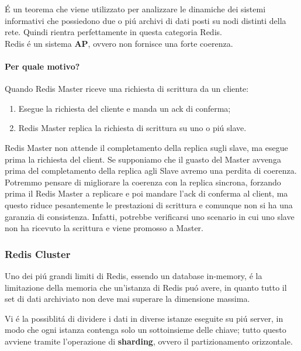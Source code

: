 É un teorema che viene utilizzato per analizzare le dinamiche dei sistemi informativi che possiedono due o piú archivi di dati posti su
nodi distinti della rete. Quindi rientra perfettamente in questa categoria Redis.\\

Redis é un sistema \textbf{AP}, ovvero non fornisce una forte coerenza.
\paragraph{Per quale motivo?\\}
Quando Redis Master riceve una richiesta di scrittura da un cliente:
\begin{enumerate}
    \item Esegue la richiesta del cliente e manda un ack di conferma;
    \item Redis Master replica la richiesta di scrittura su uno o piú slave.
\end{enumerate}

Redis Master non attende il completamento della replica sugli slave, ma esegue prima la richiesta del client.
Se supponiamo che il guasto del Master avvenga prima del completamento della replica agli Slave avremo una perdita di coerenza.\\

Potremmo pensare di migliorare la coerenza con la replica sincrona, forzando prima il Redis Master a replicare e poi mandare l'ack
di conferma al client, ma questo riduce pesantemente le prestazioni di scrittura e comunque non si ha una garanzia di consistenza.
Infatti, potrebbe verificarsi uno scenario in cui uno slave non ha ricevuto la scrittura e viene promosso a Master.


\subsubsection{Redis Cluster}
Uno dei piú grandi limiti di Redis, essendo un database in-memory, é la limitazione della memoria che un'istanza di Redis puó avere, in quanto
tutto il set di dati archiviato non deve mai superare la dimensione massima.

Vi é la possiblitá di dividere i dati in diverse istanze eseguite su piú server, in modo che ogni
istanza contenga solo un sottoinsieme delle chiave; tutto questo avviene tramite l'operazione di
\textbf{sharding}, ovvero il partizionamento orizzontale.


